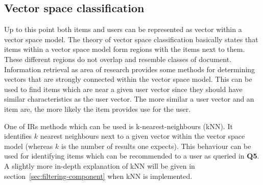 \subsection{Vector space classification}
Up to this point both items and users can be represented as vector within a vector space model.
The theory of vector space classification basically states that items within a vector space model form regions with the items next to them.
These different regions do not overlap and resemble classes of document.
\citep[p.~298-291]{manning:2009}
Information retrieval as area of research provides some methods for determining vectors that are strongly connected within the vector space model.
This can be used to find items which are near a given user vector since they should have similar characteristics as the user vector.
The more similar a user vector and an item are, the more likely the item provides use for the user.
\citep[p.~298-291]{manning:2009}

One of IRs methods which can be used is k-nearest-neighbours (kNN).
It identifies $k$ nearest neighbours next to a given vector within the vector space model (whereas $k$ is the number of results one expects).
This behaviour can be used for identifying items which can be recommended to a user as queried in \textbf{Q5}.
A slightly more in-depth explanation of kNN will be given in section~\ref{sec:filtering-component} when kNN is implemented.
%
